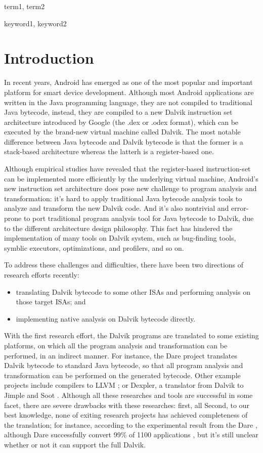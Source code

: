 \documentclass[preprint, cm]{sigplanconf}
\begin{document}

\terms
term1, term2

\keywords
keyword1, keyword2

\section{Introduction}
In recent years, Android has emerged as one of the most popular and
important platform for smart device development. Although most
Android applications are written in the Java programming language, they
are not compiled to traditional Java bytecode, instead, they
are compiled to a new Dalvik instruction set architecture
introduced by Google (the .dex or .odex format), which can
be executed by the brand-new virtual machine called Dalvik. The most notable
difference between Java bytecode and Dalvik bytecode is that the 
former is a stack-based architecture whereas the latterh is
a register-based one. 

Although empirical studies \cite{} have revealed that the register-based
instruction-set can be implemented more efficiently by the underlying
virtual machine, Android's new instruction set architecture 
does pose new challenge to program analysis and transformation: it's hard
to apply traditional Java bytecode analysis tools to analyze
and transform the new Dalvik code. And it's also nontrivial and
error-prone to port traditional program analysis tool for
Java bytecode
to Dalvik, due to the different architecture design philosophy. This
fact has hindered the implementation of many tools on Dalvik system, such
as bug-finding tools, symblic executors, optimizations, and profilers, and so on.

To address these challenges and difficulties, there have been two
directions of research efforts recently:
\begin{itemize}
  \item translating Dalvik bytecode to some other ISAs and
    performing analysis on those target ISAs; and
  \item implementing native analysis on Dalvik bytecode directly.
\end{itemize}

With the first research effort, the Dalvik programs are translated
to some existing platforms, on which all the program
analysis and transformation can be performed, in an indirect manner.
For instance, the Dare project \cite{dare2012} translates Dalvik
bytecode to standard Java bytecode, so that all program
analysis and transformation can be performed on the
generated bytecode. Other example projects include
compilers to LLVM \cite{}; or Dexpler, a translator from Dalvik
to Jimple and 
Soot \cite{}. Although all these researches and tools are successful
in some facet, there are severe drawbacks with these researches: first, all
Second, to our best knowledge, none of exiting research projects
has achieved completeness of the translation; for instance, according
to the experimental result from the Dare \cite{dare2012}, although
Dare successfully convert 99\% of 1100 applications
, but it's still unclear whether or not it can support the full Dalvik.
\end{document}
